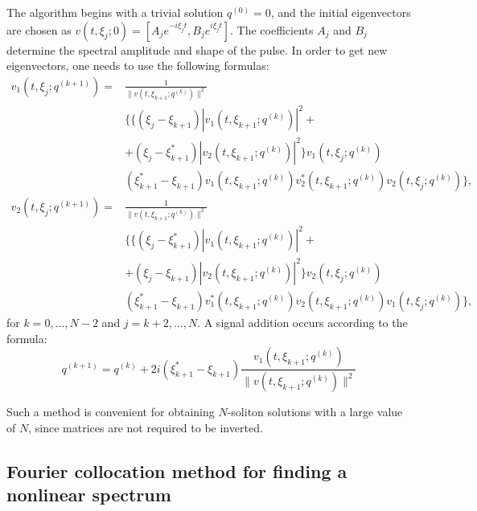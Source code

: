 The algorithm begins with a trivial solution $ q^{(0)} = 0 $, and the initial eigenvectors are chosen as $ v (t, \xi_j; 0) = [A_j e^{- i \xi_j t}, B_j e^{i \xi_j t}] $. The coefficients $ A_j $ and $ B_j $ determine the spectral amplitude and shape of the pulse.
In order to get new eigenvectors, one needs to use the following formulas:
\begin{equation}
    \begin{aligned}
        v_1(t, \xi_j; q^{(k+1)}) = & \frac{1}{\|v(t, \xi_{k+1}; q^{(k)})\|^2} \\
        & \{ \{ (\xi_j - \xi_{k+1}) |v_1(t,\xi_{k+1}; q^{(k)})|^2 + \\
        & + (\xi_j - \xi_{k+1}^{*}) |v_2(t, \xi_{k+1}; q^{(k)})|^2 \} v_1(t, \xi_j; q^{(k)}) \\
        & (\xi_{k+1}^{*} - \xi_{k+1}) v_1(t, \xi_{k+1}; q^{(k)})
            v_2^{*}(t, \xi_{k+1}; q^{(k)}) v_2(t, \xi_j; q^{(k)}) \} {,}
    \end{aligned}
\end{equation}
\begin{equation}
    \begin{aligned}
        v_2(t, \xi_j; q^{(k+1)}) = & \frac{1}{\|v(t, \xi_{k+1}; q^{(k)})\|^2} \\
        & \{ \{ (\xi_j - \xi_{k+1}^{*}) |v_1(t,\xi_{k+1}; q^{(k)})|^2 + \\
        & + (\xi_j - \xi_{k+1}) |v_2(t, \xi_{k+1}; q^{(k)})|^2 \} v_2(t, \xi_j; q^{(k)}) \\
        & (\xi_{k+1}^{*} - \xi_{k+1}) v_1^{*}(t, \xi_{k+1}; q^{(k)})
            v_2(t, \xi_{k+1}; q^{(k)}) v_1(t, \xi_j; q^{(k)}) \} {,}
    \end{aligned}
\end{equation}
for $k = 0, ..., N-2$ and $j = k+2, ..., N$.
A signal addition occurs according to the formula:
\begin{equation}
    q^{(k+1)} = q^{(k)} + 2i(\xi_{k+1}^{*} - \xi_{k+1})
    \frac{v_1(t,\xi_{k+1};q^{(k)})}
    {\|v(t,\xi_{k+1};q^{(k)})\|^2}
\end{equation}

Such a method is convenient for obtaining $ N $-soliton solutions with a large value of $ N $, since matrices are not required to be inverted.

\subsection{Fourier collocation method for finding a nonlinear spectrum}

